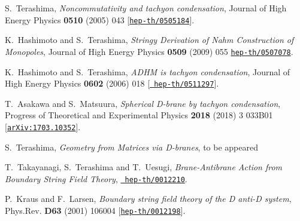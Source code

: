 \documentclass[12pt]{article}
\numberwithin{equation}{section}
\begin{document}
\begin{thebibliography}{10}
%
%
%

S.~Terashima, {\it {Noncommutativity and tachyon condensation}},  { Journal
  of High Energy Physics} {\bf 0510} (2005) 043
  [\href{http://arXiv.org/abs/0505184v4}{{\tt hep-th/0505184}}].

K.~Hashimoto and S.~Terashima, {\it {Stringy Derivation of Nahm Construction of
  Monopoles}}, {Journal of High Energy Physics} {\bf 0509} (2009) 055 \href{http://arXiv.org/abs/0507078}{{\tt hep-th/0507078}}.

K.~Hashimoto and S.~Terashima, {\it {ADHM is tachyon condensation}},  {
 Journal of High Energy Physics} {\bf 0602} (2006) 018 [\href{http://arXiv.org/abs/0511297}{{\tt
  hep-th/0511297}}].

T.~Asakawa and S.~Matsuura, {\it {Spherical D-brane by tachyon condensation}},
  { Progress of Theoretical and Experimental Physics} {\bf 2018} (2018) 3 033B01
  [\href{http://arXiv.org/abs/arXiv:1703.10352v1}{{\tt arXiv:1703.10352}}].


	S.~Terashima, {\it {Geometry from Matrices via D-branes}}, to be appeared




T.~Takayanagi, S.~Terashima and T.~Uesugi, {\it {Brane-Antibrane Action from
  Boundary String Field Theory}},  \href{http://arXiv.org/abs/0012210}{{\tt
  hep-th/0012210}}.

P.~Kraus and F.~Larsen, {\it {Boundary string field theory of the D anti-D
  system}},  { Phys.Rev.} {\bf D63} (2001) 106004
  [\href{http://arXiv.org/abs/hep-th/0012198}{{\tt hep-th/0012198}}].


\end{thebibliography}
\end{document}
